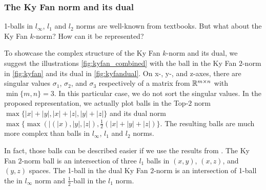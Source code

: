 \documentclass{article} %
\newcommand{\abs}[1]{\lvert #1 \rvert}
\newcommand{\Rmn}{\R^{m\times n}}
\begin{document}
\subsubsection{The Ky Fan norm and its dual}
1-balls in $l_\infty$, $l_1$ and $l_2$ norms are well-known from textbooks. But what about the Ky Fan $k$-norm? How can it be represented?

To showcase the complex structure of the Ky Fan $k$-norm and its dual, we suggest the illustrations \ref{fig:kyfan_combined} with the ball in the Ky Fan $2$-norm in \ref{fig:kyfan} and its dual in \ref{fig:kyfandual}. On x-, y-, and z-axes, there are singular values $\sigma_1$, $\sigma_2$, and $\sigma_3$ respectively of a matrix from $\Rmn$ with $\min\{m,n\}=3$. In this particular case, we do not sort the singular values. In the proposed representation, we actually plot balls in the Top-$2$ norm $\max\{\abs{x}+\abs{y}, \abs{x}+\abs{z}, \abs{y}+\abs{z}\}$ and its dual norm $\max\{\max(\abs(x),\abs{y},\abs{z}), \frac{1}{2} (\abs{x}+\abs{y}+\abs{z})\}$. The resulting balls are much more complex than balls in $l_\infty$, $l_1$ and $l_2$ norms.

In fact, those balls can be described easier if we use the results from \cite{yu2012arithmetic}. The Ky Fan $2$-norm ball is an intersection of three $l_1$ balls in $(x,y)$, $(x, z)$, and $(y,z)$ spaces. The 1-ball in the dual Ky Fan $2$-norm is an intersection of 1-ball the in $l_\infty$ norm and $\frac{1}{2}$-ball in the $l_1$ norm.
\end{document}
